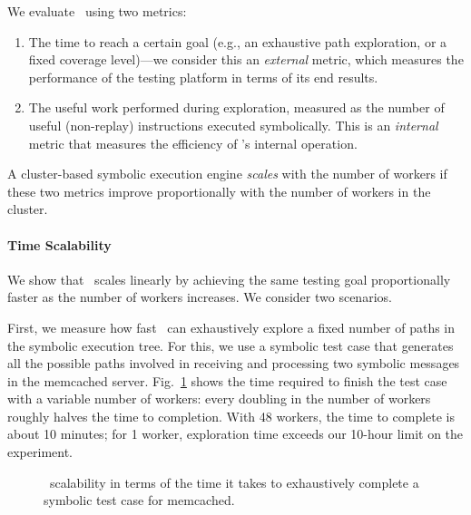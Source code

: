 We evaluate \cnine\ using two metrics:
\begin{enumerate}
\item The time to reach a certain goal (e.g., an exhaustive path exploration, or a fixed coverage level)---we consider this an \emph{external} metric, which measures the performance of the testing platform in terms of its end results.
\item The useful work performed during exploration, measured as the number of useful (non-replay) instructions executed symbolically. This is an \emph{internal} metric that measures the efficiency of \cnine's internal operation. 
\end{enumerate}

A cluster-based symbolic execution engine \emph{scales} with the number of workers if these two metrics improve proportionally with the number of workers in the cluster.

\paragraph{Time Scalability} We show that \cnine\ scales linearly by achieving the same testing goal proportionally faster as the number of workers increases. We consider two scenarios.

First, we measure how fast \cnine\ can exhaustively explore a fixed number of paths in the symbolic execution tree.  For this, we use a symbolic test case that generates all the possible paths involved in receiving and processing two symbolic messages in the memcached server.  Fig.~\ref{fig:scalab-time-vs-workers} shows the time required to finish the test case with a variable number of workers: every doubling in the number of workers roughly halves the time to completion.  With 48 workers, the time to complete is about 10 minutes; for 1 worker,  exploration time exceeds our 10-hour limit on the experiment.  


\begin{figure}[h!]
  \centering
  \caption{\cnine\ scalability in terms of the time it takes to exhaustively complete a symbolic test case for memcached.}
  \label{fig:scalab-time-vs-workers}
\end{figure}


